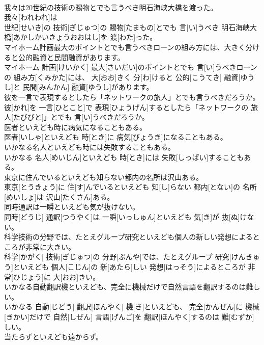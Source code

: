 \documentclass[8pt]{extreport}
\begin{document}
\begin{CJK}{UTF8}{min}
\\	我々は20世紀の技術の賜物とでも言うべき明石海峡大橋を渡った。	
\\	我々[われわれ]は 
\\	世紀[せいき]の 技術[ぎじゅつ]の 賜物[たまもの]とでも 言[い]うべき 明石海峡大橋[あかしかいきょうおおはし]を 渡[わた]った。
\\	マイホーム計画最大のポイントとでも言うべきローンの組み方には、大きく分けると公的融資と民間融資があります。	
\\	マイホーム 計画[けいかく] 最大[さいだい]のポイントとでも 言[い]うべきローンの 組み方[くみかた]には、 大[おお]きく 分[わ]けると 公的[こうてき] 融資[ゆうし]と 民間[みんかん] 融資[ゆうし]があります。
\\	彼を一言で表現するとしたら「ネットワークの旅人」とでも言うべきだろうか。	
\\	彼[かれ]を 一言[ひとこと]で 表現[ひょうげん]するとしたら「ネットワークの 旅人[たびびと]」とでも 言[い]うべきだろうか。
\\	医者といえども時に病気になることもある。	
\\	医者[いしゃ]といえども 時[とき]に 病気[びょうき]になることもある。
\\	いかなる名人といえども時には失敗することもある。	
\\	いかなる 名人[めいじん]といえども 時[とき]には 失敗[しっぱい]することもある。
\\	東京に住んでいるといえども知らない都内の名所は沢山ある。	
\\	東京[とうきょう]に 住[す]んでいるといえども 知[し]らない 都内[とない]の 名所[めいしょ]は 沢山[たくさん]ある。
\\	同時通訳は一瞬といえども気が抜けない。	
\\	同時[どうじ] 通訳[つうやく]は 一瞬[いっしゅん]といえども 気[き]が 抜[ぬ]けない。
\\	科学技術の分野では、たとえグループ研究といえども個人の新しい発想によるところが非常に大きい。	
\\	科学[かがく] 技術[ぎじゅつ]の 分野[ぶんや]では、たとえグループ 研究[けんきゅう]といえども 個人[こじん]の 新[あたら]しい 発想[はっそう]によるところが 非常[ひじょう]に 大[おお]きい。
\\	いかなる自動翻訳機といえども、完全に機械だけで自然言語を翻訳するのは難しい。	
\\	いかなる 自動[じどう] 翻訳[ほんやく] 機[き]といえども、 完全[かんぜん]に 機械[きかい]だけで 自然[しぜん] 言語[げんご]を 翻訳[ほんやく]するのは 難[むずか]しい。
\\	当たらずといえども遠からず。	

\end{CJK}
\end{document}
